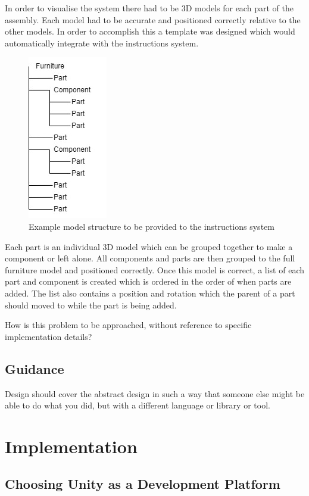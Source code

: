 \documentclass{l4proj}
\begin{document}
In order to visualise the system there had to be 3D models for each part of the assembly. Each model had to be accurate and positioned correctly relative to the other models. In order to accomplish this a template was designed which would automatically integrate with the instructions system. 

\begin{figure}[hbt!]
    \centering
    \includegraphics[width=0.2\linewidth]{dissertation//images/modelFileStructure .jpg}
    \caption{Example model structure to be provided to the instructions system}
    \label{fig:modelStruct}
\end{figure}

Each part is an individual 3D model which can be grouped together to make a component or left alone. All components and parts are then grouped to the full furniture model and positioned correctly. Once this model is correct, a list of each part and component is created which is ordered in the order of when parts are added. The list also contains a position and rotation which the parent of a part should moved to while the part is being added.

How is this problem to be approached, without reference to specific implementation details? 
\section{Guidance}
Design should cover the abstract design in such a way that someone else might be able to do what you did, but with a different language or library or tool.

\chapter{Implementation}

\section{Choosing Unity as a Development Platform}
\end{document}
